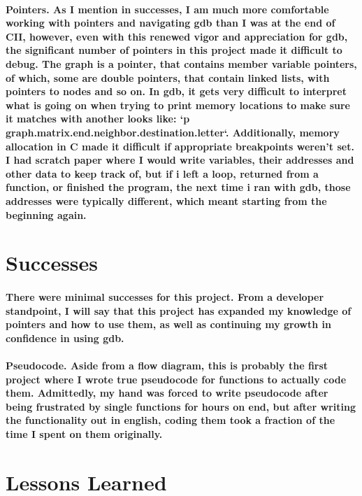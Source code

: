 \documentclass{report}
\begin{document}
\paragraph{Pointers. As I mention in successes, I am much more comfortable working with
pointers and navigating gdb than I was at the end of CII, however, even with this renewed vigor and 
appreciation for gdb, the significant number of pointers in this project made it difficult to debug.
The graph is a pointer, that contains member variable pointers, of which, some are double pointers, that
contain linked lists, with pointers to nodes and so on. In gdb, it gets very difficult to interpret
what is going on when trying to print memory locations to make sure it matches with another looks like:
`p graph.matrix.end.neighbor.destination.letter`. Additionally, memory allocation in C made it difficult if
appropriate breakpoints weren't set. I had scratch paper where I would write variables, their addresses
and other data to keep track of, but if i left a loop, returned from a function, or finished the 
program, the next time i ran with gdb, those addresses were typically different, which meant starting from
the beginning again.}

\section{Successes}
\paragraph{There were minimal successes for this project. From a developer standpoint,
I will say that this project has expanded my knowledge of pointers and how to use them, as well
as continuing my growth in confidence in using gdb.}
\paragraph{Pseudocode. Aside from a flow diagram, this is probably the first project where I 
wrote true pseudocode for functions to actually code them. Admittedly, my hand was forced
to write pseudocode after being frustrated by single functions for hours on end, but after
writing the functionality out in english, coding them took a fraction of the time I spent
on them originally.}


\section{Lessons Learned}
\end{document}
